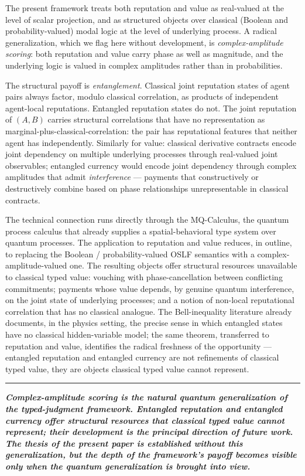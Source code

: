 \documentclass[11pt]{article}
\newcommand{\position}[1]{%
  \medskip
  \begin{quoting}[indentfirst=false, leftmargin=1em, rightmargin=1em]
  \noindent\textcolor{rhosky}{\rule{3pt}{1.2em}}\hspace{0.5em}\textbf{\textit{#1}}
  \end{quoting}
  \medskip
}
\begin{document}
The present framework treats both reputation and value as real-valued at the level of scalar projection, and as structured objects over classical (Boolean and probability-valued) modal logic at the level of underlying process. A radical generalization, which we flag here without development, is \emph{complex-amplitude scoring}: both reputation and value carry phase as well as magnitude, and the underlying logic is valued in complex amplitudes rather than in probabilities.

The structural payoff is \emph{entanglement}. Classical joint reputation states of agent pairs always factor, modulo classical correlation, as products of independent agent-local reputations. Entangled reputation states do not. The joint reputation of $(A, B)$ carries structural correlations that have no representation as marginal-plus-classical-correlation: the pair has reputational features that neither agent has independently. Similarly for value: classical derivative contracts encode joint dependency on multiple underlying processes through real-valued joint observables; entangled currency would encode joint dependency through complex amplitudes that admit \emph{interference} --- payments that constructively or destructively combine based on phase relationships unrepresentable in classical contracts.

The technical connection runs directly through the MQ-Calculus, the quantum process calculus that already supplies a spatial-behavioral type system over quantum processes. The application to reputation and value reduces, in outline, to replacing the Boolean / probability-valued OSLF semantics with a complex-amplitude-valued one. The resulting objects offer structural resources unavailable to classical typed value: vouching with phase-cancellation between conflicting commitments; payments whose value depends, by genuine quantum interference, on the joint state of underlying processes; and a notion of non-local reputational correlation that has no classical analogue. The Bell-inequality literature already documents, in the physics setting, the precise sense in which entangled states have no classical hidden-variable model; the same theorem, transferred to reputation and value, identifies the radical freshness of the opportunity --- entangled reputation and entangled currency are not refinements of classical typed value, they are objects classical typed value cannot represent.

\position{Complex-amplitude scoring is the natural quantum generalization of the typed-judgment framework. Entangled reputation and entangled currency offer structural resources that classical typed value cannot represent; their development is the principal direction of future work. The thesis of the present paper is established without this generalization, but the depth of the framework's payoff becomes visible only when the quantum generalization is brought into view.}
\end{document}
